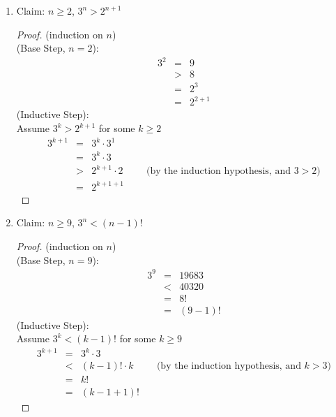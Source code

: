 \documentclass{article}
\begin{document}
\begin{enumerate}
\begin{enumerate}
        \item Claim: $n \geq 2$, $3^n > 2^{n+1}$
        \begin{proof}
            (induction on $n$) \\
            (Base Step, $n=2$):
            \begin{eqnarray}
                3^2 &=& 9 \\
                &>& 8 \\
                &=& 2^3 \\
                &=& 2^{2+1}
            \end{eqnarray}
            (Inductive Step): \\
            Assume $3^k > 2^{k+1}$ for some $k \geq 2$ \\
            \begin{eqnarray}
                3^{k+1} &=& 3^k \cdot 3^1 \\
                &=& 3^k \cdot 3 \\
                &>& 2^{k+1} \cdot 2 \hspace{1cm} \text{(by the induction hypothesis, and $3 > 2$)}\\
                &=& 2^{k+1+1}
            \end{eqnarray}
        \end{proof}
        \item Claim: $n \geq 9$, $3^n < (n-1)!$
        \begin{proof}
            (induction on $n$) \\
            (Base Step, $n=9$):
            \begin{eqnarray}
                3^9 &=& 19683 \\
                &<& 40320 \\
                &=& 8! \\
                &=& (9-1)!
            \end{eqnarray}
            (Inductive Step): \\
            Assume $3^k < (k-1)!$ for some $k \geq 9$
            \begin{eqnarray}
                3^{k+1} &=& 3^k \cdot 3 \\
                &<& (k-1)! \cdot k \hspace{1cm} \text{(by the induction hypothesis, and $k > 3$)}\\
                &=& k! \\
                &=& (k-1+1)!
            \end{eqnarray}

\end{proof}
\end{enumerate}
\end{enumerate}
\end{document}
